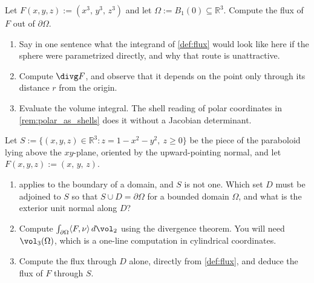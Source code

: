 \begin{aiexercise}
\label{ex:ai_flux_cubic_sphere}
Let $F(x,y,z) := (x^3,\,y^3,\,z^3)$ and let $\Omega := B_1(0) \subseteq \mathbb{R}^3$. Compute
the flux of $F$ out of $\partial\Omega$.
\begin{enumerate}[label=\textbf{(\alph*)}]
  \item Say in one sentence what the integrand of \cref{def:flux} would look like here if the
    sphere were parametrized directly, and why that route is unattractive.
  \item Compute $\divg F$, and observe that it depends on the point only through its distance
    $r$ from the origin.
  \item Evaluate the volume integral. The shell reading of polar coordinates in
    \cref{rem:polar_as_shells} does it without a Jacobian determinant.
\end{enumerate}
\end{aiexercise}

\begin{aiexercise}
\label{ex:ai_capping_a_paraboloid}
Let $S := \{(x,y,z) \in \mathbb{R}^3 : z = 1-x^2-y^2,\ z \geq 0\}$ be the piece of the
paraboloid lying above the $xy$-plane, oriented by the upward-pointing normal, and let
$F(x,y,z) := (x,\,y,\,z)$.
\begin{enumerate}[label=\textbf{(\alph*)}]
  \item {} applies to the boundary of a domain, and $S$ is not one.
    Which set $D$ must be adjoined to $S$ so that $S \cup D = \partial\Omega$ for a bounded
    domain $\Omega$, and what is the exterior unit normal along $D$?
  \item Compute $\int_{\partial\Omega}\langle F,\nu\rangle\,d\vol_2$ using the divergence
    theorem. You will need $\vol_3(\Omega)$, which is a one-line computation in cylindrical
    coordinates.
  \item Compute the flux through $D$ alone, directly from \cref{def:flux}, and deduce the flux
    of $F$ through $S$.
\end{enumerate}
\end{aiexercise}

